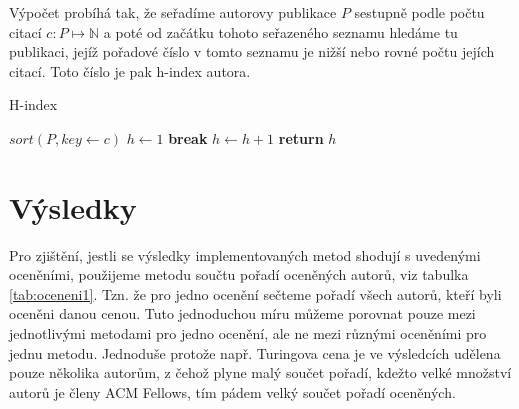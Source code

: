\documentclass{bakalarka}
\begin{document}
Výpočet probíhá tak, že seřadíme autorovy publikace $P$ sestupně podle počtu
citací $c: P \mapsto \mathbb{N}$ a poté od začátku tohoto seřazeného seznamu
hledáme tu publikaci, jejíž pořadové číslo v tomto seznamu je nižší nebo rovné
počtu jejích citací. Toto číslo je pak h-index autora.
\begin{center}
\begin{minipage}{\textwidth}
\begin{algorithm}[H]
	\caption{H-index}
		\label{alg:hindex}

	\begin{algorithmic}[1]
	\Statex
		\State $sort(P, key \gets c)$
		\State $h \gets 1$
				\State \textbf{break}
			\EndIf
			\State $h \gets h + 1$
		\EndFor
		\State \textbf{return} $h$
	\EndFunction
	\end{algorithmic}
\end{algorithm}
\end{minipage}
\end{center}
\mbox{}








\chapter{Výsledky}
Pro zjištění, jestli se výsledky implementovaných metod shodují s uvedenými
oceněními, použijeme metodu součtu pořadí oceněných autorů, viz tabulka
\ref{tab:oceneni1}. Tzn. že pro jedno ocenění sečteme pořadí všech autorů,
kteří byli oceněni danou cenou. Tuto jednoduchou míru můžeme porovnat pouze
mezi jednotlivými metodami pro jedno ocenění, ale ne mezi různými oceněními pro
jednu metodu. Jednoduše protože např. Turingova cena je ve výsledcích udělena
pouze několika autorům, z čehož plyne malý součet pořadí, kdežto velké množství
autorů je členy ACM Fellows, tím pádem velký součet pořadí oceněných.
\end{document}
